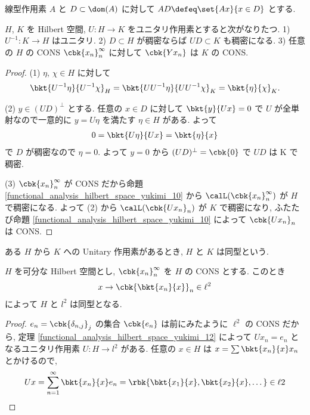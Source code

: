 \documentclass[openany, a4paper, oneside]{jsbook}
\begin{document}
線型作用素 $A$ と $D \subset \dom (A)$ に対して $AD \defeq \set{Ax}{x \in D}$ とする.
\begin{thm}
 $H$, $K$ を Hilbert 空間, $U \colon H \to K$ をユニタリ作用素とすると次がなりたつ.
 1) $U^{-1} \colon K \to H$ はユニタリ.
 2) $D \subset H$ が稠密ならば $U D \subset K$ も稠密になる.
 3) 任意の $H$ の CONS $\cbk{x_n}_n^\infty$ に対して $\cbk{Yx_n}$ は $K$ の CONS.
\end{thm}
\begin{proof}
(1) $\eta$, $\chi \in H$ に対して
\begin{align}
 \bkt{U^{-1} \eta}{U^{-1} \chi}_H
 =
 \bkt{U U^{-1} \eta}{U U^{-1} \chi}_K
 =
 \bkt{\eta}{\chi}_K.
\end{align}

(2) $y \in (UD)^\perp$ とする.
任意の $x \in D$ に対して $\bkt{y}{Ux} = 0$ で $U$ が全単射なので一意的に $y = U\eta$ を満たす $\eta \in H$ がある.
よって
\begin{align}
 0
 =
 \bkt{U \eta}{Ux}
 =
 \bkt{\eta}{x}
\end{align}
で $D$ が稠密なので $\eta = 0$.
よって $y = 0$ から $(UD)^\perp = \cbk{0}$ で $UD$ は K で稠密.

(3) $\cbk{x_n}_n^\infty$ が CONS だから命題 \ref{functional_analysis_hilbert_space_yukimi_10} から
$\calL (\cbk{x_n}_n^\infty)$ が $H$ で稠密になる.
よって (2) から $\calL (\cbk{Ux_n}_n)$ が $K$ で稠密になり,
ふたたび命題 \ref{functional_analysis_hilbert_space_yukimi_10} によって $\cbk{Ux_n}_n$ は CONS.
\end{proof}

\begin{defn}
 ある $H$ から $K$ への Unitary 作用素があるとき, $H$ と $K$ は同型という.
\end{defn}
\begin{thm}\label{functional_analysis_hilbert_space_yukimi_14}
 $H$ を可分な Hilbert 空間とし, $\cbk{x_n}_n^\infty$ を $H$ の CONS とする.
 このとき
\begin{align}
 x \to \cbk{\bkt{x_n}{x}}_n \in \ell^2
\end{align}
によって $H$ と $l^2$ は同型となる.
\end{thm}
\begin{proof}
$e_n = \cbk{\delta_{n,j}}_j$ の集合 $\cbk{e_n}$ は前にみたように $\ell^2$ の CONS だから,
定理 \ref{functional_analysis_hilbert_space_yukimi_12} によって $Ux_n = e_n$ となるユニタリ作用素 $U \colon H \to l^2$ がある.
任意の $x\in H$ は $x = \sum \bkt{x_n}{x} x_n$ とかけるので,
\begin{align}
 Ux
 =
 \sum_{n=1}^{\infty} \bkt{x_n}{x} e_n
 =
 \rbk{\bkt{x_1}{x}, \bkt{x_2}{x}, \dots} \in \ell2
\end{align}
\end{proof}
\end{document}
